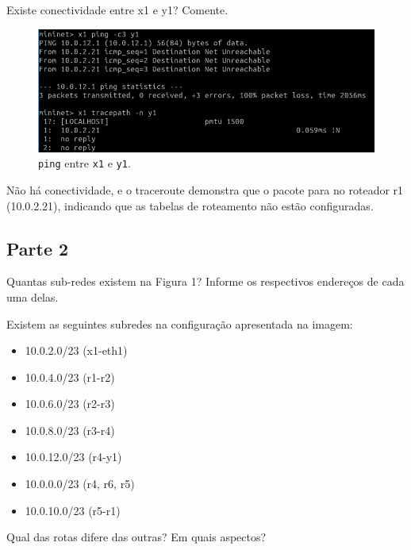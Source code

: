 \documentclass{article}
\begin{document}
\begin{tcolorbox}
    Existe conectividade entre x1 e y1? Comente.
\end{tcolorbox}

\begin{figure}[!htb]
\centering
\includegraphics[width=\columnwidth]{images/p1_ping.png}
\caption{\texttt{ping} entre \texttt{x1} e \texttt{y1}.}
\end{figure}

Não há conectividade, e o traceroute demonstra que o pacote
para no roteador r1 (10.0.2.21), indicando que as tabelas de
roteamento não estão configuradas.

\subsection*{Parte 2}

\begin{tcolorbox}
    Quantas sub-redes existem na Figura 1? Informe os respectivos endereços de cada uma delas.
\end{tcolorbox}

Existem as seguintes subredes na configuração apresentada na imagem:

\begin{itemize}
    \item 10.0.2.0/23 (x1-eth1)
    \item 10.0.4.0/23 (r1-r2)
    \item 10.0.6.0/23 (r2-r3)
    \item 10.0.8.0/23 (r3-r4)
    \item 10.0.12.0/23 (r4-y1)
    \item 10.0.0.0/23 (r4, r6, r5)
    \item 10.0.10.0/23 (r5-r1)
\end{itemize}

\begin{tcolorbox}
    Qual das rotas difere das outras? Em quais aspectos?
\end{tcolorbox}
\end{document}
